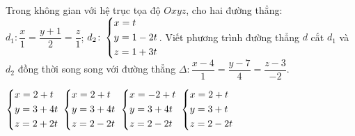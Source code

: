 \begin{ex}%
	Trong không gian với hệ trục tọa độ $Oxyz$, cho hai đường thẳng:
	$d_1 \colon \dfrac{x}{1}=\dfrac{y+1}{2}=\dfrac{z}{1}$; $ d_2\colon\left\{\begin{aligned}
		& x=t \\ 
		& y=1-2t \\ 
		& z=1+3t \end{aligned}\right.$.
	Viết phương trình đường thẳng $d$ cắt $d_1$ và $d_2$ đồng thời song song với đường thẳng  $\Delta \colon\dfrac{x-4}{1}=\dfrac{y-7}{4}=\dfrac{z-3}{-2}$.
	
	\choice
	{$\left\{\begin{aligned}
			& x=2+t \\ 
			& y=3+4t \\ 
			& z=2+2t \end{aligned}\right.$                         }
	{\True  $\left\{\begin{aligned}
			& x=2+t \\ 
			& y=3+4t \\ 
			& z=2-2t \end{aligned}\right.$            }  
	{$\left\{\begin{aligned}
			& x=-2+t \\ 
			& y=3+4t \\ 
			& z=2-2t \end{aligned}\right.$}
	{ $\left\{\begin{aligned}
			& x=2+t \\ 
			& y=3+t \\ 
			& z=2-2t \end{aligned}\right.$}
\end{ex}

